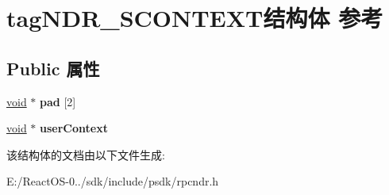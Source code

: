 \hypertarget{structtag_n_d_r___s_c_o_n_t_e_x_t}{}\section{tag\+N\+D\+R\+\_\+\+S\+C\+O\+N\+T\+E\+X\+T结构体 参考}
\label{structtag_n_d_r___s_c_o_n_t_e_x_t}
\subsection*{Public 属性}
\begin{DoxyCompactItemize}
\item 
\mbox{\label{structtag_n_d_r___s_c_o_n_t_e_x_t_affd2123f5e883815c7b8f159a4449681}} 
\hyperlink{interfacevoid}{void} $\ast$ {\bfseries pad} \mbox{[}2\mbox{]}
\item 
\mbox{\label{structtag_n_d_r___s_c_o_n_t_e_x_t_ac8a0daaebf512a88f73a79987648399c}} 
\hyperlink{interfacevoid}{void} $\ast$ {\bfseries user\+Context}
\end{DoxyCompactItemize}


该结构体的文档由以下文件生成\+:\begin{DoxyCompactItemize}
\item 
E\+:/\+React\+O\+S-\/0../sdk/include/psdk/rpcndr.\+h\end{DoxyCompactItemize}
